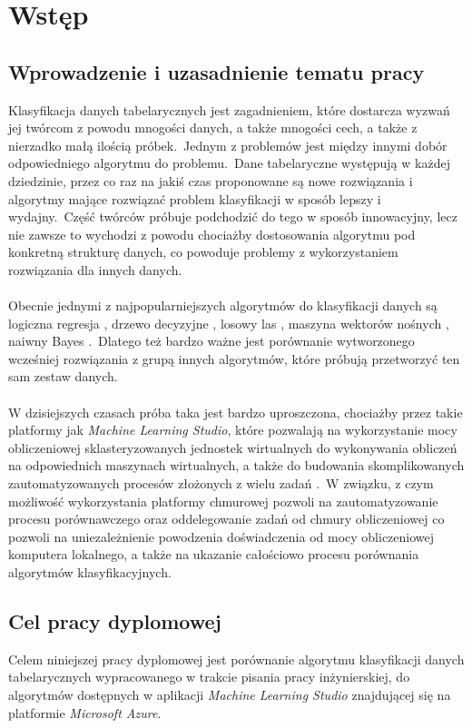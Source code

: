 \chapter{Wstęp}

\section{Wprowadzenie i uzasadnienie tematu pracy}
Klasyfikacja danych tabelarycznych jest zagadnieniem, które dostarcza wyzwań jej twórcom z powodu mnogości danych, a także mnogości cech, a także z nierzadko małą ilością próbek.\ Jednym z problemów jest między innymi dobór odpowiedniego algorytmu do problemu.\ Dane tabelaryczne występują w każdej dziedzinie, przez co raz na jakiś czas proponowane są nowe rozwiązania i algorytmy mające rozwiązać problem klasyfikacji w sposób lepszy i wydajny.\ Część twórców próbuje podchodzić do tego w sposób innowacyjny, lecz nie zawsze to wychodzi z powodu chociażby dostosowania algorytmu pod konkretną strukturę danych, co powoduje problemy z wykorzystaniem rozwiązania dla innych danych.
\\ \\
Obecnie jednymi z najpopularniejszych algorytmów do klasyfikacji danych są logiczna regresja , drzewo decyzyjne , losowy las , maszyna wektorów nośnych , naiwny Bayes .\ Dlatego też bardzo ważne jest porównanie wytworzonego wcześniej rozwiązania z grupą innych algorytmów, które próbują przetworzyć ten sam zestaw danych.
\\ \\
W dzisiejszych czasach próba taka jest bardzo uproszczona, chociażby przez takie platformy jak \textit{Machine Learning Studio}, które pozwalają na wykorzystanie mocy obliczeniowej sklasteryzowanych jednostek wirtualnych do wykonywania obliczeń na odpowiednich maszynach wirtualnych, a także do budowania skomplikowanych zautomatyzowanych procesów złożonych z wielu zadań .\ W związku, z czym możliwość wykorzystania platformy chmurowej pozwoli na zautomatyzowanie procesu porównawczego oraz oddelegowanie zadań od chmury obliczeniowej co pozwoli na uniezależnienie powodzenia doświadczenia od mocy obliczeniowej komputera lokalnego, a także na ukazanie całościowo procesu porównania algorytmów klasyfikacyjnych.

\section{Cel pracy dyplomowej}
Celem niniejszej pracy dyplomowej jest porównanie algorytmu klasyfikacji danych tabelarycznych wypracowanego w trakcie pisania pracy inżynierskiej, do algorytmów dostępnych w aplikacji \textit{Machine Learning Studio} znajdującej się na platformie \textit{Microsoft Azure}.

